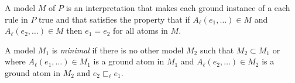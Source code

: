 \documentclass[10pt,twocolumn]{article}
\begin{document}
A model $M$ of $P$ is an interpretation that makes each ground instance of a each rule in $P$ true and that satisfies the property that if $A_\ell(e_1, \dots) \in M$ and $A_\ell(e_2, \dots) \in M$ then $e_1 = e_2$ for all atoms in $M$.

A model $M_1$ is \emph{minimal} if there is no other model $M_2$ such 
that $M_2 \subset M_1$ or where $A_\ell(e_1, \dots) \in M_1$ is a ground atom in $M_1$ 
and $A_\ell(e_2, \dots) \in M_2$ is a ground atom in $M_2$ and $e_2 \sqsubset_\ell e_1$.



\end{document}
